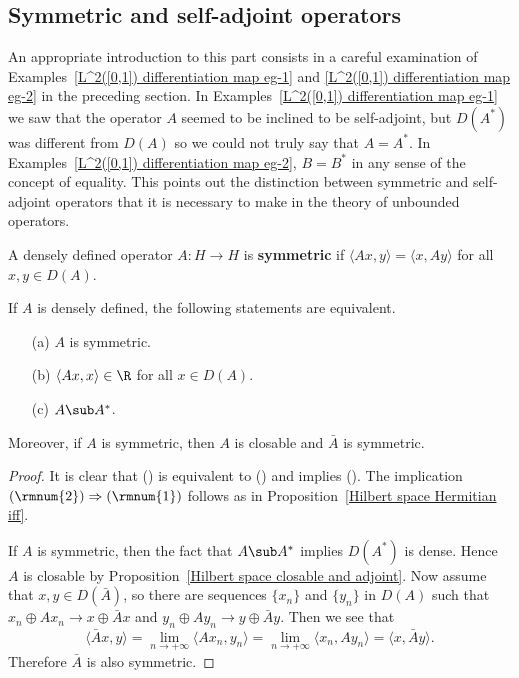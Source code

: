 \subsection{Symmetric and self-adjoint operators}
An appropriate introduction to this part consists in a careful examination
of Examples~\ref{L^2([0,1]) differentiation map eg-1} and \ref{L^2([0,1]) differentiation map eg-2} in the preceding section. In Examples~\ref{L^2([0,1]) differentiation map eg-1} we saw that the operator $A$ seemed to be inclined to be self-adjoint, but $D(A^*)$ was different from $D(A)$ so we could not truly say that $A=A^*$. In Examples~\ref{L^2([0,1]) differentiation map eg-2}, $B=B^*$ in any sense of the concept of equality. This points out the distinction between symmetric and self-adjoint operators that it is necessary to make in the theory of unbounded operators.
\begin{definition}
A densely defined operator $A:H\to H$ is \textbf{symmetric} if $\langle Ax,y\rangle=\langle x,Ay\rangle$ for all $x,y\in D(A)$.
\end{definition}
\begin{proposition}\label{Hilbert space unbounded symmetric iff}
If $A$ is densely defined, the following statements are equivalent.
\begin{itemize}
\item[(a)] $A$ is symmetric.
\item[(b)] $\langle Ax,x\rangle\in \R$ for all $x\in D(A)$.
\item[(c)] $A\sub A^*$.
\end{itemize}
Moreover, if $A$ is symmetric, then $A$ is closable and $\bar{A}$ is symmetric.
\end{proposition}
\begin{proof}
It is clear that () is equivalent to () and implies (). The implication $(\rmnum{2})\Rightarrow(\rmnum{1})$ follows as in Proposition~\ref{Hilbert space Hermitian iff}.\par
If $A$ is symmetric, then the fact that $A\sub A^*$ implies $D(A^*)$ is dense. Hence $A$ is closable by Proposition~\ref{Hilbert space closable and adjoint}. Now assume that $x,y\in D(\bar{A})$, so there are sequences $\{x_n\}$ and $\{y_n\}$ in $D(A)$ such that $x_n\oplus Ax_n\to x\oplus\bar{A}x$ and $y_n\oplus Ay_n\to y\oplus\bar{A}y$. Then we see that
\[\langle \bar{A}x,y\rangle=\lim_{n\to+\infty}\langle Ax_n,y_n\rangle=\lim_{n\to+\infty}\langle x_n,Ay_n\rangle=\langle x,\bar{A}y\rangle.\]
Therefore $\bar{A}$ is also symmetric.
\end{proof}
